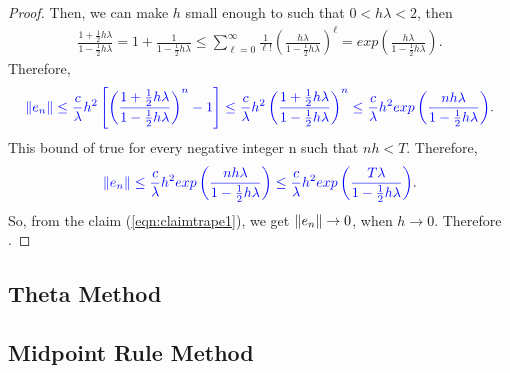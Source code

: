 \documentclass[12pt]  {article}%
\begin{document}
\begin{proof}
Then, we can make $h$ small enough to such that $0<h\lambda<2$, then
\begin{eqnarray*}
\frac{1+\frac{1}{2}h\lambda}{1-\frac{1}{2}h\lambda}=1+\frac{1}{1-\frac{1}{2}h\lambda}\leq \sum_{\ell=0}^{\infty}\frac{1}{\ell!}\left(\frac{h\lambda}{1-\frac{1}{2}h\lambda}\right)^\ell=exp\left(\frac{h\lambda}{1-\frac{1}{2}h\lambda}\right).
\end{eqnarray*}
Therefore,
 \begin{eqnarray}
 \textcolor{blue}{\left\|e_n\right\| \leq \frac{c}{\lambda}h^2\left[\left(\frac{1+\frac{1}{2}h\lambda}{1-\frac{1}{2}h\lambda}\right)^n-1\right]\leq \frac{c}{\lambda}h^2\left(\frac{1+\frac{1}{2}h\lambda}{1-\frac{1}{2}h\lambda}\right)^n\leq \frac{c}{\lambda}h^2exp\left(\frac{nh\lambda}{1-\frac{1}{2}h\lambda}\right)}.
\end{eqnarray}
This bound of true for every negative integer n such that $nh<T$.
Therefore,
 \begin{eqnarray}\label{eqn:claimtrape1}
 \textcolor{blue}{\left\|e_n\right\| \leq \frac{c}{\lambda}h^2exp\left(\frac{nh\lambda}{1-\frac{1}{2}h\lambda}\right) \leq\frac{c}{\lambda}h^2exp\left(\frac{T\lambda}{1-\frac{1}{2}h\lambda}\right)}.
\end{eqnarray}
So, from the claim (\ref{eqn:claimtrape1}), we get $\left\|e_n\right\|\to 0$, when $h\to 0$. Therefore
.
\end{proof}



\subsection{Theta Method}

\subsection{Midpoint Rule Method}
\end{document}
